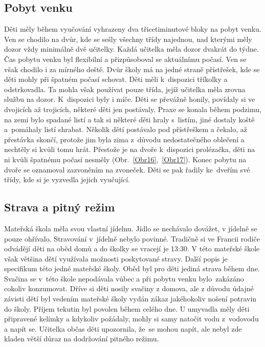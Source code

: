 		\subsection{Pobyt venku}
		\label{prestavka}
			Děti měly během vyučování vyhrazeny dva třicetiminutové bloky na pobyt venku. Ven se chodilo na dvůr, kde se sešly všechny třídy najednou, nad kterými měly dozor vždy minimálně dvě učitelky. Každá učitelka měla dozor dvakrát do týdne. Čas pobytu venku byl flexibilní a přizpůsoboval se aktuálnímu počasí. Ven se však chodilo i za mírného deště. Dvůr školy má na jedné straně přístřešek, kde se děti mohly při špatném počasí schovat. Děti měli k dispozici tříkolky a odstrkovadla. Ta mohla však používat pouze třída, jejíž učitelka měla zrovna službu na dozor. K dispozici byly i míče. Děti se převážně honily, povídaly si ve dvojicích až trojicích, některé děti jen postávaly. Praxe se konala během podzimu, na zemi bylo spadané listí a tak si některé děti hraly s listím, jiné dostaly koště a pomáhaly listí shrabat. Několik dětí postávalo pod přístřeškem a čekalo, až přestávka skončí, protože jim byla zima z důvodu nedostatečného oblečení a nechtěly si kvůli tomu hrát. Přestože je na dvoře k dispozici prolézačka, děti na ni kvůli špatnému počasí nesměly (Obr.~\ref{Obr16},~\ref{Obr17}). 
			Konec pobytu na dvoře se oznamoval zazvoněním na zvoneček. Děti se pak řadily ke dveřím své třídy, kde si je vyzvedla jejich vyučující. 

		\subsection{Strava a pitný režim}
			Mateřská škola měla svou vlastní jídelnu. Jídlo se nechávalo dovážet, v jídelně se pouze ohřívalo. Stravování v jídelně nebylo povinné. Tradičně si ve Francii rodiče odvádějí děti na oběd domů a do školky se vracejí je 13:30. V této mateřské škole však většina dětí využívala možnosti poskytované stravy. 
			Další popis je specifikum této jedné mateřské školy. Oběd byl pro děti jediná strava během dne. Svačina se v této škole nepodávala vůbec a při pobytu venku bylo zakázáno cokoliv konzumovat. Dříve si děti nosily svačiny z domova, ale z důvodu údajné závisti dětí byl vedením mateřské školy vydán zákaz jakéhokoliv nošení potravin do školy. 
			Příjem tekutin byl povolen během celého dne. U umyvadla měly děti připravené kelímky a kdykoliv požádaly, mohly si samy natočit vodu z vodovodu a napít se. Učitelka občas děti upozornila, že se mohou napít, ale nebyl zde kladen větší důraz na dodržování pitného režimu.


